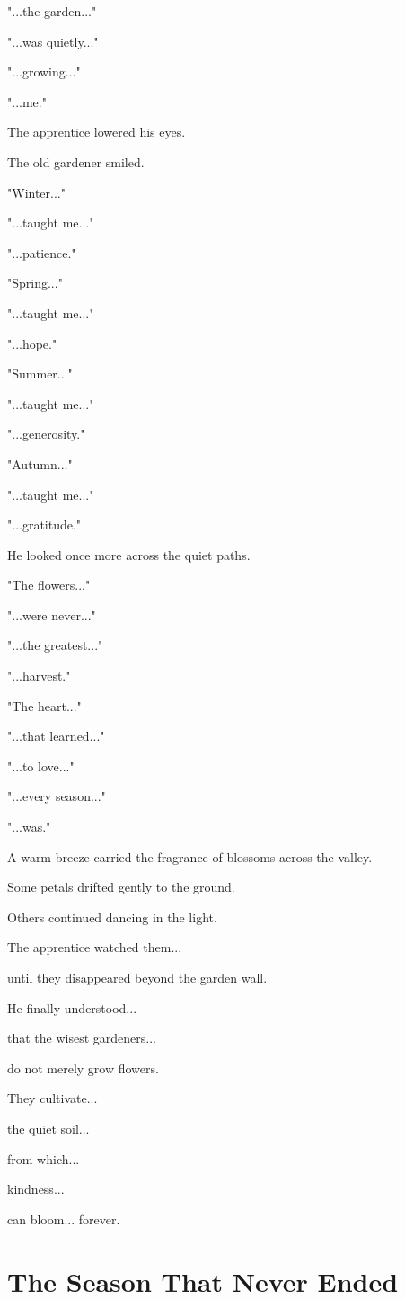 \documentclass[12pt,openany]{book}
\begin{document}
"...the garden..."

"...was quietly..."

"...growing..."

"...me."

The apprentice lowered his eyes.

The old gardener smiled.

"Winter..."

"...taught me..."

"...patience."

"Spring..."

"...taught me..."

"...hope."

"Summer..."

"...taught me..."

"...generosity."

"Autumn..."

"...taught me..."

"...gratitude."

He looked once more across the quiet paths.

"The flowers..."

"...were never..."

"...the greatest..."

"...harvest."

"The heart..."

"...that learned..."

"...to love..."

"...every season..."

"...was."

A warm breeze carried the fragrance of blossoms across the valley.

Some petals drifted gently to the ground.

Others continued dancing in the light.

The apprentice watched them...

until they disappeared beyond the garden wall.

He finally understood...

that the wisest gardeners...

do not merely grow flowers.

They cultivate...

the quiet soil...

from which...

kindness...

can bloom...
forever.
\section*{The Season That Never Ended}
\end{document}
